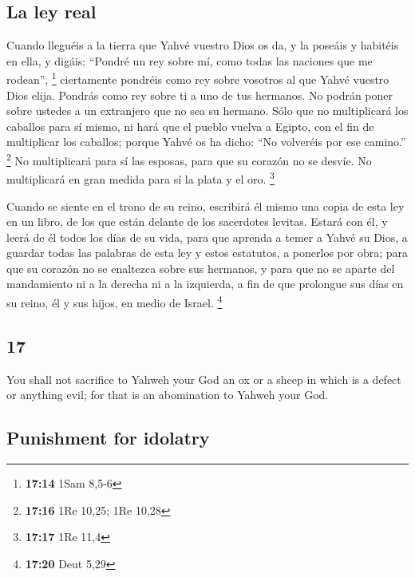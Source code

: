 \begin{paracol}{2}
\hypertarget{la-ley-real}{%
\subsection{La ley real}\label{la-ley-real}}

 Cuando lleguéis a la tierra que Yahvé vuestro Dios os
da, y la poseáis y habitéis en ella, y digáis: ``Pondré un rey sobre mí,
como todas las naciones que me rodean'', \footnote{\textbf{17:14} 1Sam
  8,5-6}  ciertamente pondréis como rey sobre vosotros al
que Yahvé vuestro Dios elija. Pondrás como rey sobre ti a uno de tus
hermanos. No podrán poner sobre ustedes a un extranjero que no sea su
hermano.  Sólo que no multiplicará los caballos para sí
mismo, ni hará que el pueblo vuelva a Egipto, con el fin de multiplicar
los caballos; porque Yahvé os ha dicho: ``No volveréis por ese camino.''
\footnote{\textbf{17:16} 1Re 10,25; 1Re 10,28}  No
multiplicará para sí las esposas, para que su corazón no se desvíe. No
multiplicará en gran medida para sí la plata y el oro. \footnote{\textbf{17:17}
  1Re 11,4}

 Cuando se siente en el trono de su reino, escribirá él
mismo una copia de esta ley en un libro, de los que están delante de los
sacerdotes levitas.  Estará con él, y leerá de él todos
los días de su vida, para que aprenda a temer a Yahvé su Dios, a guardar
todas las palabras de esta ley y estos estatutos, a ponerlos por obra;
 para que su corazón no se enaltezca sobre sus hermanos,
y para que no se aparte del mandamiento ni a la derecha ni a la
izquierda, a fin de que prolongue sus días en su reino, él y sus hijos,
en medio de Israel. \footnote{\textbf{17:20} Deut 5,29}

\switchcolumn
\begin{otherlanguage}{english}

\hypertarget{section-33}{%
\section{17}\label{section-33}}

 You shall not sacrifice to Yahweh your God an ox or a
sheep in which is a defect or anything evil; for that is an abomination
to Yahweh your God.

\hypertarget{punishment-for-idolatry}{%
\subsection{Punishment for idolatry}\label{punishment-for-idolatry}}


\end{otherlanguage}
\end{paracol}
